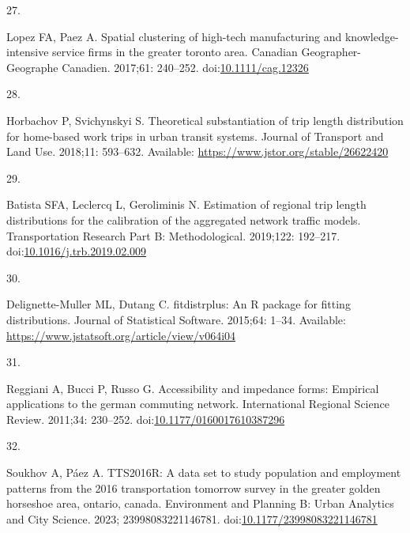 \documentclass[10pt,letterpaper]{article}
\newlength{\cslhangindent}
\newlength{\csllabelwidth}
\newlength{\cslentryspacingunit} %
\newenvironment{CSLReferences}[2] %
 {%
  \setlength{\parindent}{0pt}
  \ifodd #1
  \let\oldpar\par
  \def\par{\hangindent=\cslhangindent\oldpar}
  \fi
  \setlength{\parskip}{#2\cslentryspacingunit}
 }%
 {}
\newcommand{\CSLLeftMargin}[1]{\parbox[t]{\csllabelwidth}{#1}}
\newcommand{\CSLRightInline}[1]{\parbox[t]{\linewidth - \csllabelwidth}{#1}\break}
\begin{document}
\begin{CSLReferences}{0}{0}
\leavevmode{}%
\CSLLeftMargin{27. }%
\CSLRightInline{Lopez FA, Paez A. Spatial clustering of high-tech
manufacturing and knowledge-intensive service firms in the greater
toronto area. Canadian Geographer-Geographe Canadien. 2017;61: 240--252.
doi:\href{https://doi.org/10.1111/cag.12326}{10.1111/cag.12326}}

\leavevmode{}%
\CSLLeftMargin{28. }%
\CSLRightInline{Horbachov P, Svichynskyi S. Theoretical substantiation
of trip length distribution for home-based work trips in urban transit
systems. Journal of Transport and Land Use. 2018;11: 593--632.
Available: \url{https://www.jstor.org/stable/26622420}}

\leavevmode{}%
\CSLLeftMargin{29. }%
\CSLRightInline{Batista SFA, Leclercq L, Geroliminis N. Estimation of
regional trip length distributions for the calibration of the aggregated
network traffic models. Transportation Research Part B: Methodological.
2019;122: 192--217.
doi:\href{https://doi.org/10.1016/j.trb.2019.02.009}{10.1016/j.trb.2019.02.009}}

\leavevmode{}%
\CSLLeftMargin{30. }%
\CSLRightInline{Delignette-Muller ML, Dutang C. {fitdistrplus}: An {R}
package for fitting distributions. Journal of Statistical Software.
2015;64: 1--34. Available:
\url{https://www.jstatsoft.org/article/view/v064i04}}

\leavevmode{}%
\CSLLeftMargin{31. }%
\CSLRightInline{Reggiani A, Bucci P, Russo G. Accessibility and
impedance forms: Empirical applications to the german commuting network.
International Regional Science Review. 2011;34: 230--252.
doi:\href{https://doi.org/10.1177/0160017610387296}{10.1177/0160017610387296}}

\leavevmode{}%
\CSLLeftMargin{32. }%
\CSLRightInline{Soukhov A, Páez A. {TTS}2016R: A data set to study
population and employment patterns from the 2016 transportation tomorrow
survey in the greater golden horseshoe area, ontario, canada.
Environment and Planning B: Urban Analytics and City Science. 2023;
23998083221146781.
doi:\href{https://doi.org/10.1177/23998083221146781}{10.1177/23998083221146781}}

\end{CSLReferences}

\nolinenumbers
\end{document}

